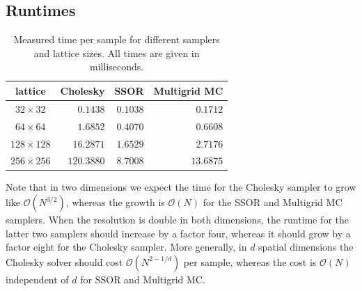 \documentclass[11pt]{article}
\begin{document}
\subsection{Runtimes}
\begin{table}
    \begin{center}
        \begin{tabular}{crrr}
            \hline
            lattice         & \multicolumn{1}{c}{Cholesky} & \multicolumn{1}{c}{SSOR} & \multicolumn{1}{c}{Multigrid MC} \\
            \hline\hline
            $32\times 32$   & $0.1438$                     & $0.1038$                 & $0.1712$                         \\
            $64\times 64$   & $1.6852$                     & $0.4070$                 & $0.6608$                         \\
            $128\times 128$ & $16.2871$                    & $1.6529$                 & $2.7176$                         \\
            $256\times 256$ & $120.3880$                   & $8.7008$                 & $13.6875$                        \\
            \hline
        \end{tabular}
        \caption{Measured time per sample for different samplers and lattice sizes. All times are given in milliseconds.}
        \label{tab:runtimes}
    \end{center}
\end{table}
Note that in two dimensions we expect the time for the Cholesky sampler to grow like $\mathcal{O}(N^{3/2})$, whereas the growth is $\mathcal{O}(N)$ for the SSOR and Multigrid MC samplers. When the resolution is double in both dimensions, the runtime for the latter two samplers should increase by a factor four, whereas it should grow by a factor eight for the Cholesky sampler. More generally, in $d$ spatial dimensions the Cholesky solver should cost $\mathcal{O}(N^{2-1/d})$ per sample, whereas the cost is $\mathcal{O}(N)$ independent of $d$ for SSOR and Multigrid MC.
\end{document}
